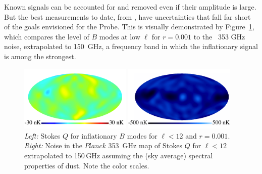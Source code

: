 Known signals can be accounted for and removed even if their amplitude is large. 
But the best measurements to date, from \planck , have uncertainties that 
fall far short of the goals envisioned for the Probe. 
This is visually demonstrated by Figure~\ref{fig:Qrp001}, which 
compares the level of $B$ modes at low $\ell$ for $r = 0.001$ to the \planck\ 353 GHz noise, 
extrapolated to 150~GHz, a frequency band in which the inflationary signal is among the strongest. 
\begin{figure}[ht!]
\hspace{.05in}
\parbox{2.in}{\centerline {
\includegraphics[width=2.1in]{Figures/P15_2_12_rp001.pdf} } }
\parbox{2.1in}{\centerline { 
\includegraphics[width=2.1in]{Figures/P353_N_2_12.pdf} } }
\hspace{0.in}
\parbox{2.2in} { 
\caption{ \footnotesize \setlength{\baselineskip}{0.95\baselineskip}
{\it Left:} Stokes $Q$ for inflationary $B$ modes for $\ell<12$ and $r=0.001$. 
 {\it Right:} Noise in the $Planck$ 353~GHz map of Stokes $Q$ for $\ell<12$ 
 extrapolated to 150\,GHz assuming the (sky average) spectral properties of dust. 
 Note the color scales.  
\label{fig:Qrp001}  }  }
\vspace{-0.05in}
\end{figure}


